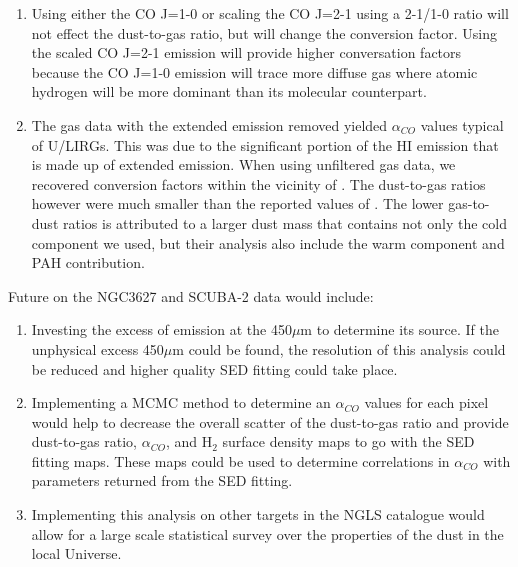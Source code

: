 \begin{enumerate}
\item{Using either the CO J=1-0 or scaling the CO J=2-1 using a 2-1/1-0 ratio will not effect the dust-to-gas ratio, but will change the conversion factor.  Using the scaled CO J=2-1 emission will provide higher conversation factors because the CO J=1-0 emission will trace more diffuse gas \citep{wilson1990} where atomic hydrogen will be more dominant than its molecular counterpart.}

\item{The gas data with the extended emission removed yielded $\alpha_{CO}$ values typical of U/LIRGs.  This was due to the significant portion of the HI emission that is made up of extended emission.  When using unfiltered gas data, we recovered conversion factors within the vicinity of \cite{sandstrom2013}.  The dust-to-gas ratios however were much smaller than the reported values of \cite{sandstrom2013}.  The lower gas-to-dust ratios is attributed to a larger dust mass that contains not only the cold component we used, but their analysis also include the warm component and PAH contribution.}

\end{enumerate}

Future on the NGC3627 and SCUBA-2 data would include:

\begin{enumerate}

\item{Investing the excess of emission at the 450$\mu$m to determine its source.  If the unphysical excess 450$\mu$m could be found, the resolution of this analysis could be reduced and higher quality SED fitting could take place.}

\item{Implementing a MCMC method to determine an $\alpha_{CO}$ values for each pixel would help to decrease the overall scatter of the dust-to-gas ratio and provide dust-to-gas ratio, $\alpha_{CO}$, and H$_2$ surface density maps to go with the SED fitting maps.  These maps could be used to determine correlations in $\alpha_{CO}$ with parameters returned from the SED fitting.}

\item{Implementing this analysis on other targets in the NGLS catalogue would allow for a large scale  statistical survey over the properties of the dust in the local Universe.}

\end{enumerate}